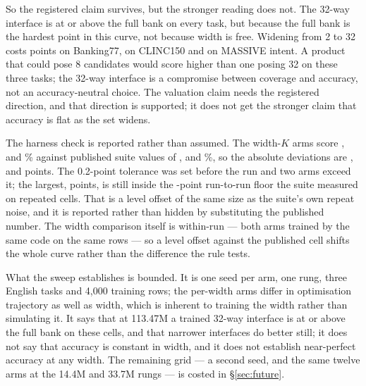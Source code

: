 So the registered claim survives, but the stronger reading does not. The 32-way
interface is at or above the full bank on every task, but because the full bank
is the hardest point in this curve, not because width is free. Widening from 2 to 32 costs \EBankCostTwoToThirtyTwo{} points on Banking77,
\EClincCostTwoToThirtyTwo{} on CLINC150 and \EMassiveCostTwoToThirtyTwo{} on MASSIVE intent. A product
that could pose 8 candidates would score higher than one posing 32 on these
three tasks; the 32-way interface is a compromise between coverage and accuracy,
not an accuracy-neutral choice. The valuation claim needs the registered
direction, and that direction is supported; it does not get the stronger claim
that accuracy is flat as the set widens.

The harness check is reported rather than assumed. The width-\(K\) arms score
\EBankWK, \EClincWK{} and \EMassiveWK\% against published suite values of
\EBankPublished, \EClincPublished{} and \EMassivePublished\%, so the absolute
deviations are \EBankHarnessDelta, \EClincHarnessDelta{} and
\EMassiveHarnessDelta{} points. The 0.2-point tolerance was set before the run
and two arms exceed it; the largest, \EMaxHarnessDelta{} points, is still inside
the \SuiteReplicationMax-point run-to-run floor the suite measured on repeated
cells. That is a level offset of the same size as the suite's own repeat noise,
and it is reported rather than hidden by substituting the published number.
The width comparison itself is within-run --- both arms trained by the same code
on the same rows --- so a level offset against the published cell shifts the
whole curve rather than the difference the rule tests.

What the sweep establishes is bounded. It is one seed per arm, one rung, three
English tasks and 4{,}000 training rows; the per-width arms differ in
optimisation trajectory as well as width, which is inherent to training the width
rather than simulating it. It says that at 113.47M a trained 32-way interface
is at or above the full bank on these cells, and that narrower interfaces do
better still;
it does not say that accuracy is constant in width, and it does not establish
near-perfect accuracy at any width. The remaining grid --- a second seed, and the
same twelve arms at the 14.4M and 33.7M rungs --- is costed in
\S\ref{sec:future}.
